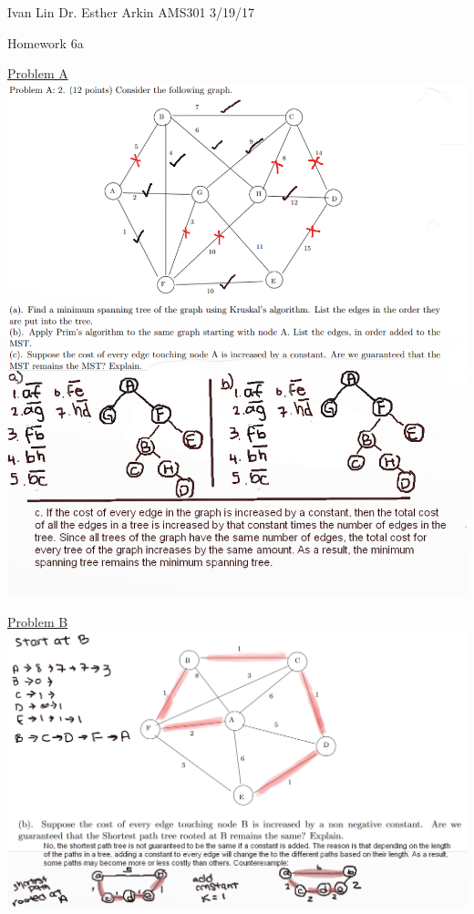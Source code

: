 \documentclass{article}
\begin{document}
Ivan Lin\newline{}
Dr. Esther Arkin\newline{}
AMS301\newline{}
3/19/17

\begin{center}
  Homework 6a
\end{center}

\underline{Problem A}\newline{}
\includegraphics[width=\textwidth]{testams301.png}

\underline{Problem B}\newline{}
\includegraphics[width=\textwidth]{testams302.png}
\end{document}
